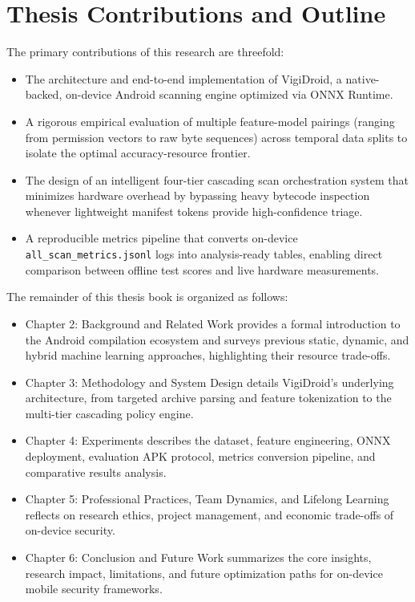 \section{Thesis Contributions and Outline}
The primary contributions of this research are threefold:
\begin{itemize}

\item The architecture and end-to-end implementation of VigiDroid, a native-backed, on-device Android scanning engine optimized via ONNX Runtime.

\item A rigorous empirical evaluation of multiple feature-model pairings (ranging from permission vectors to raw byte sequences) across temporal data splits to isolate the optimal accuracy-resource frontier.

\item The design of an intelligent four-tier cascading scan orchestration system that minimizes hardware overhead by bypassing heavy bytecode inspection whenever lightweight manifest tokens provide high-confidence triage.

\item A reproducible metrics pipeline that converts on-device \texttt{all\_scan\_metrics.jsonl} logs into analysis-ready tables, enabling direct comparison between offline test scores and live hardware measurements.
\end{itemize}
The remainder of this thesis book is organized as follows:
\begin{itemize}

\item Chapter 2: Background and Related Work provides a formal introduction to the Android compilation ecosystem and surveys previous static, dynamic, and hybrid machine learning approaches, highlighting their resource trade-offs.

\item Chapter 3: Methodology and System Design details VigiDroid’s underlying architecture, from targeted archive parsing and feature tokenization to the multi-tier cascading policy engine.

\item Chapter 4: Experiments describes the dataset, feature engineering, ONNX deployment, evaluation APK protocol, metrics conversion pipeline, and comparative results analysis.

\item Chapter 5: Professional Practices, Team Dynamics, and Lifelong Learning reflects on research ethics, project management, and economic trade-offs of on-device security.

\item Chapter 6: Conclusion and Future Work summarizes the core insights, research impact, limitations, and future optimization paths for on-device mobile security frameworks.
\end{itemize}



\endinput